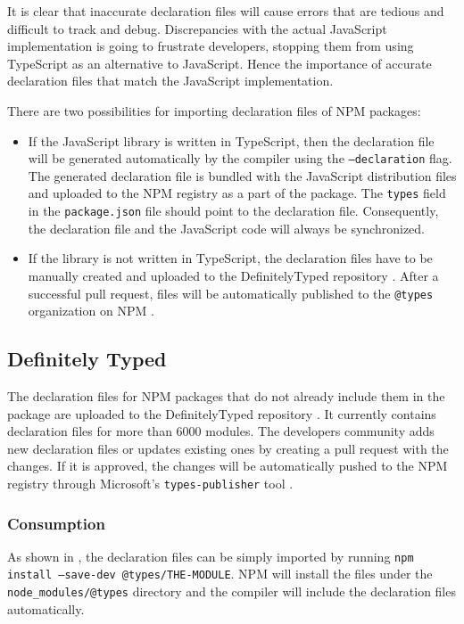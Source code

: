 It is clear that inaccurate declaration files will cause errors that are tedious and difficult to track and debug. Discrepancies with the actual JavaScript implementation is going to frustrate developers, stopping them from using TypeScript as an alternative to JavaScript. Hence the importance of accurate declaration files that match the JavaScript implementation.

There are two possibilities for importing declaration files of NPM packages:
\begin{itemize}
	\item If the JavaScript library is written in TypeScript, then the declaration file will be generated automatically by the compiler using the \texttt{--declaration} flag. The generated declaration file is bundled with the JavaScript distribution files and uploaded to the NPM registry as a part of the package. The \texttt{types} field in the \texttt{package.json} file should point to the declaration file. Consequently, the declaration file and the JavaScript code will always be synchronized.
	\item If the library is not written in TypeScript, the declaration files have to be manually created and uploaded to the DefinitelyTyped repository \citep{definitely-typed-repository}. After a successful pull request, files will be automatically published to the \texttt{@types} organization on NPM \citep{types-organization-npm}.
\end{itemize}

\subsection{Definitely Typed}
The declaration files for NPM packages that do not already include them in the package are uploaded to the DefinitelyTyped repository \citep{definitely-typed-repository}. It currently contains declaration files for more than 6000 modules. The developers community adds new declaration files or updates existing ones by creating a pull request with the changes. If it is approved, the changes will be automatically pushed to the NPM registry through Microsoft's \texttt{types-publisher} tool \citep{types-publisher}.

\subsubsection{Consumption}
As shown in , the declaration files can be simply imported by running \texttt{npm install --save-dev @types/THE-MODULE}. NPM will install the files under the \texttt{node_modules/@types} directory and the compiler will include the declaration files automatically.

